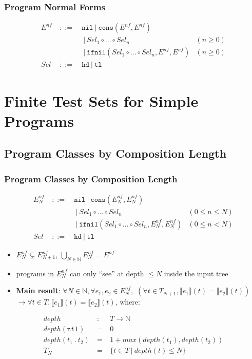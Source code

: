 \documentclass{beamer}
\begin{document}
\begin{frame}
  \frametitle{Program Normal Forms}
  \[\begin{array}{lclr}
  E^{nf} & ~::=~ & \texttt{nil} ~|~ \texttt{cons}(E^{nf}, E^{nf}) & \\
         &       & ~|~ \mathit{Sel}_1 \circ \ldots \circ \mathit{Sel}_n & (n \ge 0) \\
         &       & ~|~ \texttt{ifnil}(\mathit{Sel}_1 \circ \ldots \circ \mathit{Sel}_n, E^{nf}, E^{nf}) & (n \ge 0) \\
  \mathit{Sel} & ~::=~ & \texttt{hd} ~|~ \texttt{tl} & 
  \end{array}
  \]
  
\end{frame}

\section{Finite Test Sets for Simple Programs}

\subsection{Program Classes by Composition Length}

\begin{frame}
  \frametitle{Program Classes by Composition Length}
  \[\begin{array}{lclr}
  E^{nf}_N & ~::=~ & \texttt{nil} ~|~ \texttt{cons}(E^{nf}_N, E^{nf}_N) & \\
         &       & ~|~ \mathit{Sel}_1 \circ \ldots \circ \mathit{Sel}_n & (0 \le n \le N) \\
         &       & ~|~ \texttt{ifnil}(\mathit{Sel}_1 \circ \ldots \circ \mathit{Sel}_n, E^{nf}_N, E^{nf}_N) & (0 \le n < N) \\
  \mathit{Sel} & ~::=~ & \texttt{hd} ~|~ \texttt{tl} & 
  \end{array}
  \]
  \pause
  \begin{itemize}
    \item $E^{nf}_N \varsubsetneq E^{nf}_{N+1}$, $\bigcup_{N \in \mathbb{N}} E^{nf}_N = E^{nf}$
  \pause
    \item programs in $E^{nf}_N$ can only ``see'' at depth $\le N$ inside the input tree  
  \pause
    \item \textbf{Main result}:
    $\forall N \in \mathbb{N}, \forall e_1, e_2 \in E^{nf}_N,$ 
    $(\forall t \in T_{N+1}, \llbracket e_1 \rrbracket (t) = \llbracket e_2 \rrbracket (t))$
    $\rightarrow \forall t \in T, \llbracket e_1 \rrbracket (t) = \llbracket e_2 \rrbracket (t)$, where:
  \end{itemize}
    \[\begin{array}{lcl}
    \mathit{depth} & ~:~ & T \rightarrow \mathbb{N} \\
    \mathit{depth}(\texttt{nil}) & ~=~ & 0 \\
    \mathit{depth}(t_1 ~.~ t_2) & ~=~ & 1 + \mathit{max}(\mathit{depth}(t_1), \mathit{depth}(t_2)) \\
    T_{N} & ~=~ & \{t \in T ~|~ \mathit{depth}(t) \le N \} 
    \end{array}
    \]
\end{frame}
\end{document}
